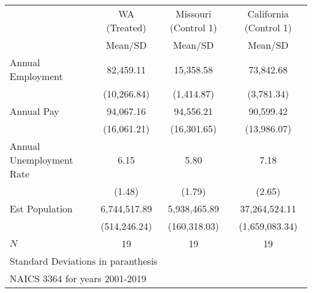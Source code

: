 {
\def\sym#1{\ifmmode^{#1}\else\(^{#1}\)\fi}
\begin{tabular}{l*{3}{c}}
\hline\hline
            &\multicolumn{1}{c}{WA (Treated)}&\multicolumn{1}{c}{Missouri (Control 1)}&\multicolumn{1}{c}{California (Control 1)}\\
            &     Mean/SD&     Mean/SD&     Mean/SD\\
\hline
Annual Employment&   82,459.11&   15,358.58&   73,842.68\\
            & (10,266.84)&  (1,414.87)&  (3,781.34)\\
Annual Pay  &   94,067.16&   94,556.21&   90,599.42\\
            & (16,061.21)& (16,301.65)& (13,986.07)\\
Annual Unemployment Rate&        6.15&        5.80&        7.18\\
            &      (1.48)&      (1.79)&      (2.65)\\
Est Population&6,744,517.89&5,938,465.89&37,264,524.11\\
            &(514,246.24)&(160,318.03)&(1,659,083.34)\\
\hline
\(N\)       &          19&          19&          19\\
\hline\hline
\multicolumn{4}{l}{\footnotesize Standard Deviations in paranthesis}\\
\multicolumn{4}{l}{\footnotesize NAICS 3364 for years 2001-2019}\\
\end{tabular}
}
